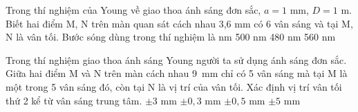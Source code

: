 \begin{vidu}%
Trong thí nghiệm của Young về giao thoa ánh sáng đơn sắc, $a = 1 $ mm, $D =1 $ m. Biết hai điểm M, N trên màn quan sát cách nhau 3,6 mm có 6 vân sáng và tại M, N là vân tối. Bước sóng dùng trong thí nghiệm là
\choice
{ nm}
{500 nm}
{480 nm}
{560 nm}
\end{vidu} 
\begin{vidu}%
Trong thí nghiệm giao thoa ánh sáng Young người ta sử dụng ánh sáng đơn sắc. Giữa hai điểm M và N trên màn cách nhau 9\ mm chỉ có 5 vân sáng mà tại M là một trong 5 vân sáng đó, còn tại N là vị trí của vân tối. Xác định vị trí vân tối thứ 2 kể từ vân sáng trung tâm.
\choice
{\True $ \pm 3$ mm}
{$ \pm 0,3$ mm}
{$ \pm 0,5$ mm}
{$ \pm 5$ mm}
\end{vidu} 

